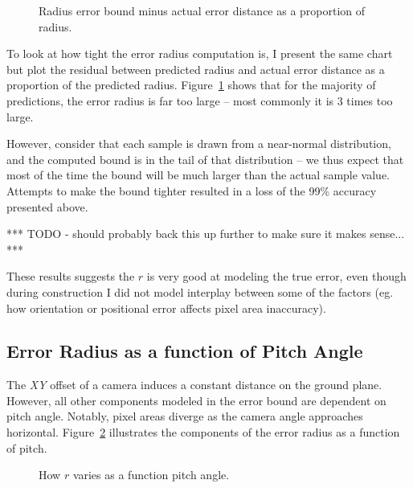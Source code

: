 \documentclass[a4paper,12pt,twoside,openright]{report}
\begin{document}
\begin{figure}[htb]
    \begin{center}
        
    \end{center}
    \caption[Bound Minus True Distance as a Proportion]{Radius error bound minus actual error distance as a proportion of radius.}
    \label{fig:camera:proportional diff}
\end{figure}

To look at how tight the error radius computation is, I present the same chart
but plot the residual between predicted radius and actual error distance as a 
proportion of the predicted radius. Figure~\ref{fig:camera:proportional diff} shows that for the majority
of predictions, the error radius is far too large -- most commonly it is 3 times 
too large. 

However, consider that each sample is drawn from a near-normal distribution,
and the computed bound is in the tail of that distribution -- we thus expect
that most of the time the bound will be much larger than the actual sample value.
Attempts to make the bound tighter resulted in a loss of the 99\% accuracy presented above.


*** TODO - should probably back this up further to make sure it makes sense... ***

These results suggests the $r$ is very good at modeling the true error, even though during construction
I did not model interplay between some of the factors (eg. how orientation 
or positional error affects pixel area inaccuracy).

\subsection{Error Radius as a function of Pitch Angle}

The \textit{XY} offset of a camera induces a constant distance on the ground plane. However,
all other components modeled in the error bound are dependent on pitch angle. Notably,
pixel areas diverge as the camera angle approaches horizontal. Figure~\ref{fig:camera:radius versus pitch}
illustrates the components of the error radius as a function of pitch.

\begin{figure}[htb]
    \begin{center}
        
    \end{center}
    \caption[$r$ as a Function of Pitch Angle]{How $r$ varies as a function pitch angle.}
    \label{fig:camera:radius versus pitch}
\end{figure}
\end{document}
